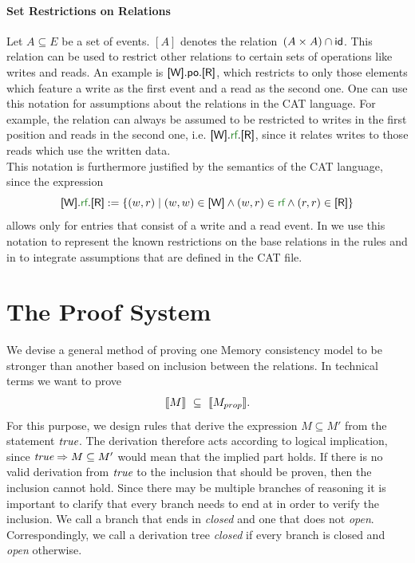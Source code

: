 \documentclass[a4paper,twoside,12pt, english]{article}
\begin{document}
\paragraph{Set Restrictions on Relations} 
Let $A \subseteq E$ be a set of events. $[A]$ denotes the relation~$(A \times A) \cap \textsf{\upshape id}$. This relation can be used to restrict other relations to certain sets of operations like writes and reads.
An example is $\textsf{\upshape [W]}.\textsf{\upshape po} .\textsf{\upshape [R]}$, which restricts \po{} to only those elements which feature a write as the first event and a read as the second one. One can use this notation for assumptions about the relations in the CAT language. For example, the \rf{} relation can always be assumed to be restricted to writes in the first position and reads in the second one, i.e. $\relW.\rf .\relR$, since it relates writes to those reads which use the written data. \\
This notation is furthermore justified by the semantics of the CAT language, since the expression
\[\relW.\rf .\relR := \{(w,r) \mid (w,w) \in \relW \land (w,r) \in \rf \land (r,r) \in \relR\}\]
allows only for entries that consist of a write and a read event. 
In  we use this notation to represent the known restrictions on the base relations in the rules and in  to integrate assumptions that are defined in the CAT file.
\pagebreak

\section{The Proof System} \label{sec:proofsys}
We devise a general method of proving one Memory consistency model to be stronger than another based on inclusion between the relations. In technical terms we want to prove \[\llbracket M \rrbracket~\subseteq~\llbracket M_{prop} \rrbracket.\] For this purpose, we design rules that derive the expression $M \subseteq M'$ from the statement $\textit{true}$. The derivation therefore acts according to logical implication, since $\textit{true} \Rightarrow M \subseteq M'$ would mean that the implied part holds. If there is no valid derivation from $\textit{true}$ to the inclusion that should be proven, then the inclusion cannot hold.
Since there may be multiple branches of reasoning it is important to clarify that every branch needs to end at \true{} in order to verify the inclusion. We call a branch that ends in \true{} \textit{closed} and one that does not \textit{open}. Correspondingly, we call a derivation tree \textit{closed} if every branch is closed and \textit{open} otherwise.
\end{document}
